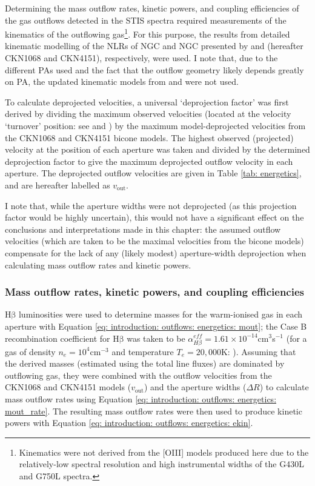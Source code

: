Determining the mass outflow rates, kinetic powers, and coupling efficiencies of the gas outflows detected in the STIS spectra required measurements of the kinematics of the outflowing gas\footnote{Kinematics were not derived from the [OIII] models produced here due to the relatively-low spectral resolution and high instrumental widths of the G430L and G750L spectra.}. For this purpose, the results from detailed kinematic modelling of the NLRs of NGC and NGC presented by \citet{Crenshaw2000_N1068} and \citet{Crenshaw2000_N4151} (hereafter CKN1068 and CKN4151), respectively, were used. I note that, due to the different PAs used and the fact that the outflow geometry likely depends greatly on PA, the updated kinematic models from \citet{Das2005} and \citet{Das2006} were not used. 

To calculate deprojected velocities, a universal `deprojection factor' was first derived by dividing the maximum observed velocities (located at the velocity `turnover' position: see \citealt{Crenshaw2000_N1068} and \citealt{Crenshaw2000_N4151}) by the maximum model-deprojected velocities from the CKN1068 and CKN4151 bicone models. The highest observed (projected) velocity at the position of each aperture was taken and divided by the determined deprojection factor to give the maximum deprojected outflow velocity in each aperture. The deprojected outflow velocities are given in Table \ref{tab: energetics}, and are hereafter labelled as $v_\mathrm{out}$. 

I note that, while the aperture widths were not deprojected (as this projection factor would be highly uncertain), this would not have a significant effect on the conclusions and interpretations made in this chapter: the assumed outflow velocities (which are taken to be the maximal velocities from the bicone models) compensate for the lack of any (likely modest) aperture-width deprojection when calculating mass outflow rates and kinetic powers.

\subsubsection{Mass outflow rates, kinetic powers, and coupling efficiencies}
\label{section: stis_seyferts: mout_ekin_fkin}

H$\mathrm{\beta}$ luminosities were used to determine masses for the warm-ionised gas in each aperture with Equation \ref{eq: introduction: outflows: energetics: mout}; the Case B recombination coefficient for H$\mathrm{\beta}$ was taken to be $\alpha^{eff}_{H\beta}=1.61\times10^{-14}$\;cm$^3$\;s$^{-1}$ (for a gas of density $n_e=10^4$\;cm$^{-3}$ and temperature $T_e=20,000$\;K: \citealt{Osterbrock2006}). Assuming that the derived masses (estimated using the total line fluxes) are dominated by outflowing gas, they were combined with the outflow velocities from the CKN1068 and CKN4151 models ($v_\mathrm{out}$) and the aperture widths ($\Delta R$) to calculate mass outflow rates using Equation \ref{eq: introduction: outflows: energetics: mout_rate}. The resulting mass outflow rates were then used to produce kinetic powers with Equation \ref{eq: introduction: outflows: energetics: ekin}.

